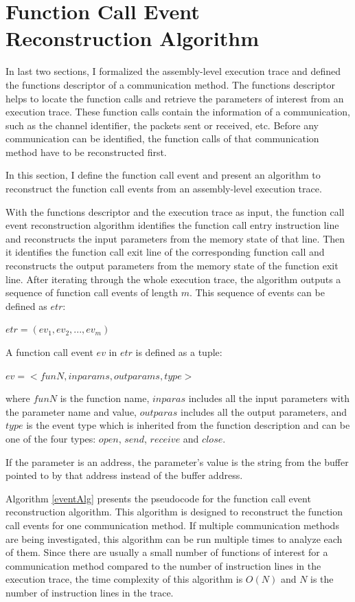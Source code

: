 \documentclass[12pt,oneside]{book}
\begin{document}
\section{Function Call Event Reconstruction Algorithm}
In last two sections, I formalized the assembly-level execution trace and defined the functions descriptor of a communication method. The functions descriptor helps to locate the function calls and retrieve the parameters of interest from an execution trace. These function calls contain the information of a communication, such as the channel identifier, the packets sent or received, etc. Before any communication can be identified, the function calls of that communication method have to be reconstructed first. 

In this section, I define the function call event and present an algorithm to reconstruct the function call events from an assembly-level execution trace. 

With the functions descriptor and the execution trace as input, the function call event reconstruction algorithm identifies the function call entry instruction line and reconstructs the input parameters from the memory state of that line. Then it identifies the function call exit line of the corresponding function call and reconstructs the output parameters from the memory state of the function exit line. After iterating through the whole execution trace, the algorithm outputs a sequence of function call events of length $m$. This sequence of events can be defined as $etr$:

$etr = (ev_1, ev_2, ..., ev_m)$

A function call event $ev$ in $etr$ is defined as a tuple:

$ev = <funN, inparams, outparams, type>$

where $funN$ is the function name, $inparas$ includes all the input parameters with the parameter name and value, $outparas$ includes all the output parameters, and $type$ is the event type which is inherited from the function description and can be one of the four types: $open$, $send$, $receive$ and $close$.


If the parameter is an address, the parameter's value is the string from the buffer pointed to by that address instead of the buffer address.

Algorithm \ref{eventAlg} presents the pseudocode for the function call event reconstruction algorithm. This algorithm is designed to reconstruct the function call events for one communication method. If multiple communication methods are being investigated, this algorithm can be run multiple times to analyze each of them. Since there are usually a small number of functions of interest for a communication method compared to the number of instruction lines in the execution trace, the time complexity of this algorithm is $O(N)$ and $N$ is the number of instruction lines in the trace.
\end{document}
